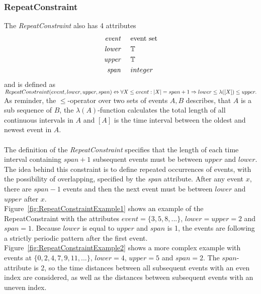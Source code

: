 	\subsubsection{RepeatConstraint}
		The \emph{RepeatConstraint} also has 4 attributes
		\begin{align*}
			\emph{event} & \hspace{.5cm}\text{event set}\\
			\emph{lower} & \hspace{.5cm}\text{$\mathbb{T}$}\\
			\emph{upper} & \hspace{.5cm}\text{$\mathbb{T}$}\\
			\emph{span}	 & \hspace{.5cm}\text{$integer$}\\
		\end{align*}
		and is defined as\\[10pt]
		\begin{math}
			RepeatConstraint ( event, lower, upper, span )\\
			\Leftrightarrow\forall X\leq event: |X|=span+1\Rightarrow lower \leq \lambda([X])\leq upper.
		\end{math}\\[10pt]
		As reminder, the $\leq$-operator over two sets of events $A, B$ describes, that $A$ is a sub sequence of $B$, the $\lambda(A)$-function calculates the total length of all continuous intervals in $A$ and $[A]$ is the time interval between the oldest and newest event in $A$.\\ \\
		The definition of the \textit{RepeatConstraint} specifies that the length of each time interval containing $span+1$ subsequent events must be between $upper$ and $lower$.\\
		The idea behind this constraint is to define repeated occurrences of events, with the possibility of overlapping, specified by the \emph{span} attribute. After any event $x$, there are $span-1$ events and then the next event must be between $lower$ and $upper$ after $x$.\\
		Figure~\ref{fig:RepeatConstraintExample1} shows an example of the RepeatConstraint with the attributes $event=\{3,5,8,...\}$, $lower=upper=2$ and $span=1$. Because $lower$ is equal to $upper$ and $span$ is 1, the events are following a strictly periodic pattern after the first event. Figure~\ref{fig:RepeatConstraintExample2} shows a more complex example with events at $\{0, 2, 4, 7, 9, 11,...\}$, $lower=4$, $upper=5$ and $span=2$. The $span$-attribute is 2, so the time distances between all subsequent events with an even index are considered, as well as the distances between subsequent events with an uneven index. 
		
